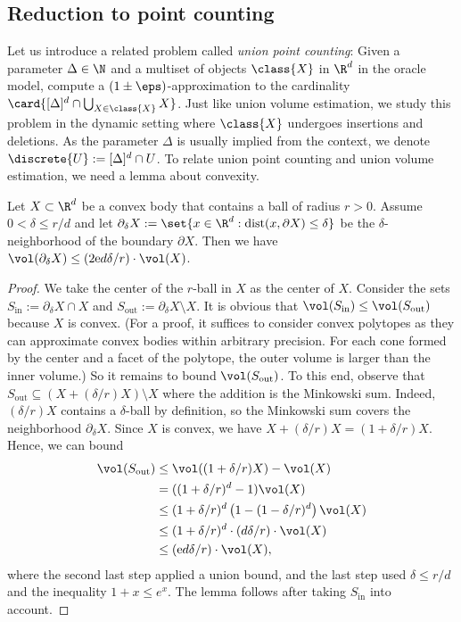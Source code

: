 \subsection{Reduction to point counting}
Let us introduce a related problem called \emph{union point counting}: Given a parameter $\Delta \in \N$ and a multiset of objects $\class{X}$ in $\R^d$ in the oracle model, compute a $(1 \pm \eps)$-approximation to the cardinality $\card{[\Delta]^d \cap \bigcup_{X \in \class{X}} X}$. Just like union volume estimation, we study this problem in the dynamic setting where $\class{X}$ undergoes insertions and deletions.
%
As the parameter $\Delta$ is usually implied from the context, we denote $\discrete{U} := [\Delta]^d \cap U$. To relate union point counting and union volume estimation, we need a lemma about convexity.
%
\begin{lemma}
    \label{lem:grid}
    Let $X \subset \R^d$ be a convex body that contains a ball of radius $r > 0$. Assume $0 < \delta \leq r/d$ and let $\partial_\delta X := \set{x \in \R^d : \mathrm{dist}(x,\partial X) \leq \delta}$ be the $\delta$-neighborhood of the boundary $\partial X$. Then we have $\vol(\partial_\delta X) \leq (2 \mathrm{e} d \delta / r) \cdot \vol(X)$.
\end{lemma}
%
\begin{proof}
    We take the center of the $r$-ball in $X$ as the center of $X$. Consider the sets $S_\text{in} := \partial_\delta X \cap X$ and $S_\text{out} := \partial_\delta X \setminus X$. It is obvious that $\vol(S_\text{in}) \leq \vol(S_\text{out})$ because $X$ is convex. (For a proof, it suffices to consider convex polytopes as they can approximate convex bodies within arbitrary precision. For each cone formed by the center and a facet of the polytope, the outer volume is larger than the inner volume.) So it remains to bound $\vol(S_\text{out})$.
%
    To this end, observe that $S_\text{out} \subseteq (X + (\delta/r) X) \setminus X$ where the addition is the Minkowski sum. Indeed, $(\delta/r) X$ contains a $\delta$-ball by definition, so the Minkowski sum covers the neighborhood $\partial_\delta X$.
%
    Since $X$ is convex, we have $X + (\delta/r) X = (1+\delta/r) X$. Hence, we can bound
    \begin{align*}
        \vol(S_\text{out})
        &\leq \vol((1+\delta/r)X) - \vol(X) \\
        &= ((1+\delta/r)^d - 1) \vol(X) \\
        &\leq (1+\delta/r)^d \left( 1 - (1 - \delta/r)^d \right) \vol(X) \\
        &\leq (1+\delta/r)^d \cdot (d \delta / r) \cdot \vol(X) \\
        &\leq (\mathrm{e} d \delta/r) \cdot \vol(X),
    \end{align*}
    where the second last step applied a union bound, and the last step used $\delta \leq r/d$ and the inequality $1+x \leq e^x$. The lemma follows after taking $S_\text{in}$ into account.
\end{proof}
